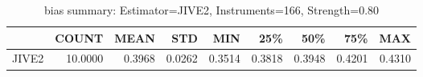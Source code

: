 \begin{table}[ht]
\centering
\caption{bias summary: Estimator=JIVE2, Instruments=166, Strength=0.80}
\begin{tabular}{lrrrrrrrr}
\toprule
 & COUNT & MEAN & STD & MIN & 25\% & 50\% & 75\% & MAX \\
\midrule
JIVE2 & 10.0000 & 0.3968 & 0.0262 & 0.3514 & 0.3818 & 0.3948 & 0.4201 & 0.4310 \\
\bottomrule
\end{tabular}
\end{table}
